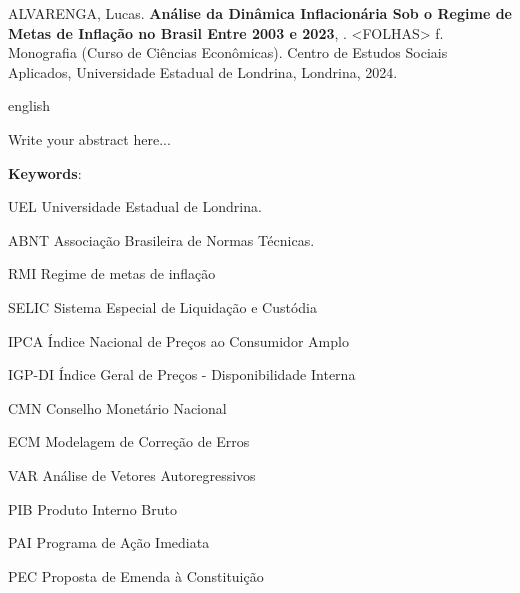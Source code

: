 \documentclass[12pt,oneside,a4paper,chapter=TITLE,english,brazil,sumario=abnt-6027-2012]{abntex2}
\begin{document}
\noindent
ALVARENGA, Lucas. {\bfseries Análise da Dinâmica Inflacionária Sob o Regime de Metas de Inflação no Brasil Entre 2003 e 2023}, \imprimirdata. <FOLHAS> f. Monografia (Curso de Ciências Econômicas). Centro de Estudos Sociais Aplicados, Universidade Estadual de Londrina, Londrina, 2024.

\begin{resumo}[Abstract]
	\begin{otherlanguage*}{english}
		
		Write your abstract here... 
		
		\vspace{\onelineskip}
		
		\noindent 
		\textbf{Keywords}: 
	\end{otherlanguage*}
\end{resumo}
\pagebreak


\listoffigures*
\cleardoublepage


\listoftables*
\cleardoublepage


\begin{siglas}
	\item[UEL] Universidade Estadual de Londrina. 
	\item[ABNT] Associação Brasileira de Normas Técnicas.
	\item[RMI] Regime de metas de inflação
	\item[SELIC] Sistema Especial de Liquidação e Custódia
	\item[IPCA] Índice Nacional de Preços ao Consumidor Amplo
	\item[IGP-DI] Índice Geral de Preços - Disponibilidade Interna
	\item[CMN] Conselho Monetário Nacional
	\item[ECM] Modelagem de Correção de Erros
	\item[VAR] Análise de Vetores Autoregressivos
	\item[PIB] Produto Interno Bruto
	\item[PAI] Programa de Ação Imediata
	\item[PEC] Proposta de Emenda à Constituição
\end{siglas}
\pagebreak


\end{document}
